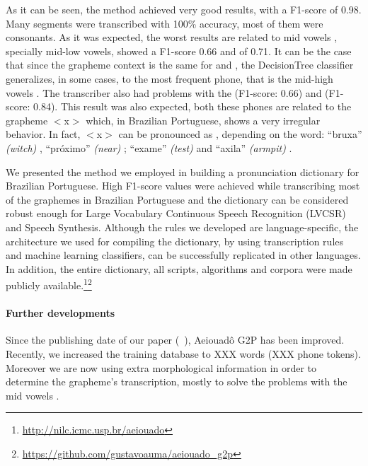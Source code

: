 As it can be seen, the method achieved very good results, with a F1-score of 0.98. Many segments were transcribed with 100\% accuracy, most of them were consonants. As it was expected, the worst results are related to mid vowels \textipa{[E, e, O, o]}, specially mid-low vowels, \textipa{[E]} showed a F1-score 0.66 and \textipa{[O]} of 0.71. It can be the case that since the grapheme context is the same for \textipa{[E, e]} and \textipa{[O, o]}, the DecisionTree classifier generalizes, in some cases, to the most frequent phone, that is the mid-high vowels \textipa{[e,o]}. The transcriber also had problems with the \textipa{[k.s]} (F1-score: 0.66) and \textipa{[S]} (F1-score: 0.84). This result was also expected, both these phones are related to the grapheme $<$x$>$ which, in Brazilian Portuguese, shows a very irregular behavior. In fact, $<$x$>$ can be pronounced as \textipa{[S, s, z, k.s]}, depending on the  word:  ``bruxa'' \emph{(witch)} \textipa{[S]}, ``pr\'oximo'' \emph{(near)} \textipa{[s]};  ``exame'' \emph{(test)} \textipa{[z]} and ``axila'' \emph{(armpit)} \textipa{[k.s]}.

We presented the method we employed in building a pronunciation dictionary for Brazilian Portuguese. High F1-score values were achieved while transcribing most of the graphemes in Brazilian Portuguese and the dictionary can be considered robust enough for Large Vocabulary Continuous Speech Recognition (LVCSR) and Speech Synthesis. Although the rules we developed are language-specific, the architecture we used for compiling the dictionary, by using transcription rules and machine learning classifiers, can be successfully replicated in other languages. In addition, the entire dictionary, all scripts, algorithms and corpora were made publicly available.\footnote{\url{http://nilc.icmc.usp.br/aeiouado}}\footnote{\url{https://github.com/gustavoauma/aeiouado_g2p}}

\paragraph{Further developments}

Since the publishing date of our paper (\citeauthor{Mendonca2014}~\cite{Mendonca2014}), Aeiouad\^o \ac{G2P} has been improved. Recently, we increased the training database to XXX words (XXX phone tokens). Moreover we are now using extra morphological information in order to determine the grapheme's transcription, mostly to solve the problems with the mid vowels \textipa{[E, e, O, o]}. 

